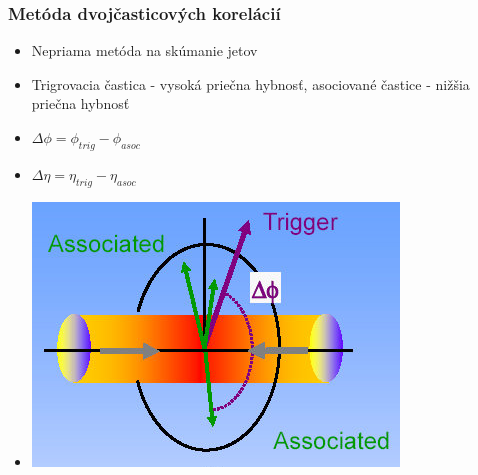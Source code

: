 \documentclass{beamer}
\begin{document}
	\begin{frame}
		\frametitle{Metóda dvojčasticových korelácií}
		\begin{itemize}
			\item Nepriama metóda na skúmanie jetov
			\item Trigrovacia častica - vysoká priečna hybnosť, asociované častice - nižšia priečna hybnosť
			\item [] $ \Delta \phi = \phi_{trig} - \phi_{asoc} $
			\item [] $\Delta \eta = \eta_{trig} - \eta_{asoc}$
			\item [] \centering \includegraphics[scale=0.4]{../Obrazky_praca/dihadron.png}
		\end{itemize}
	\end{frame}
	
\end{document}
